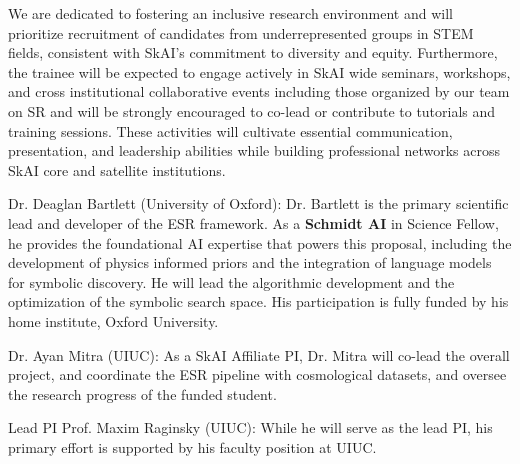 \documentclass[11pt]{article}
\begin{document}
 We are dedicated to fostering an inclusive research environment and will prioritize recruitment of candidates from underrepresented groups in STEM fields, consistent with SkAI’s commitment to diversity and equity. Furthermore, the trainee will be expected to engage actively in SkAI wide seminars, workshops, and cross institutional collaborative events including those organized by our team on SR and will be strongly encouraged to co-lead or contribute to tutorials and training sessions. These activities will cultivate essential communication, presentation, and leadership abilities while building  professional networks across SkAI core and satellite institutions.




\pagebreak

%

\teaminfo
Dr. Deaglan Bartlett (University of Oxford): Dr. Bartlett is the primary scientific lead and developer of the ESR framework. As a \textbf{Schmidt AI} in Science Fellow, he provides the foundational AI expertise that powers this proposal, including the development of physics informed priors and the integration of language models for symbolic discovery. He will lead the algorithmic development and the optimization of the symbolic search space. His participation is fully funded by his home institute, Oxford University.

Dr. Ayan Mitra (UIUC): As a SkAI Affiliate PI, Dr. Mitra will co-lead the overall project, and coordinate the ESR  pipeline with cosmological datasets, and oversee the  research progress of the funded student.


Lead PI Prof. Maxim Raginsky (UIUC): While he will serve as the lead PI, his primary effort is supported by his faculty position at UIUC.
\end{document}
